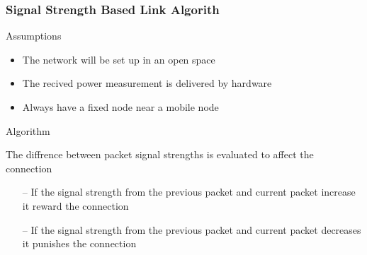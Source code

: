 \begin{frame}[t]
  \frametitle{Signal Strength Based Link Algorith}

  Assumptions
  \begin{itemize}
  \item The network will be set up in an open space
  \item The recived power measurement is delivered by hardware
  \item Always have a fixed node near a mobile node
  \end{itemize}

  \vfill
  
  Algorithm
  \item The diffrence between packet signal strengths is evaluated to affect
    the connection
    \begin{itemize}
      \item[--] If the signal strength from the previous packet and current
        packet increase it reward the connection
      \item[--] If the signal strength from the previous packet and current
        packet decreases it punishes the connection
  \end{itemize}

  \vfill

  \begin{flushleft}
    \begin{tiny}
      \begin{minipage}{1.0\linewidth}
      \end{minipage}
    \end{tiny}
  \end{flushleft}

\end{frame}    

